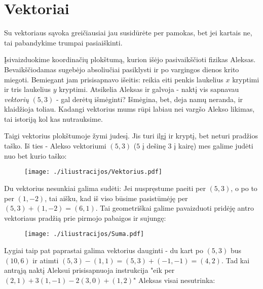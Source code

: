 \section{Vektoriai}

Su vektoriaus sąvoka greičiausiai jau susidūrėte per pamokas, bet jei kartais ne, tai pabandykime trumpai pasiaiškinti.

\medskip

Įsivaizduokime koordinačių plokštumą, kurion išėjo pasivaikščioti fizikas Aleksas. Bevaikščiodamas sugebėjo absoliučiai pasiklysti ir po vargingos dienos krito miegoti. Bemiegant jam prisisapnavo išeitis: reikia eiti penkis laukelius $x$ kryptimi ir tris laukelius $y$ kryptimi. Atsikelia Aleksas ir galvoja - naktį vis sapnavau {\it vektorių} $(5,3)$ - gal derėtų išmėginti? Išmėgina, bet, deja namų neranda, ir klaidžioja toliau. Kadangi vektorius mums rūpi labiau nei vargšo Alekso likimas, tai istoriją kol kas nutrauksime.  

\medskip

Taigi vektorius plokštumoje žymi judesį. Jis turi ilgį ir kryptį, bet neturi pradžios taško. Iš ties - Alekso vektoriumi $(5,3)$ ($5$ į dešinę $3$ į kairę) mes galime judėti nuo bet kurio taško:

\begin{figure}[h!]
  \begin{center}
    \texttt{[image: ./iliustracijos/Vektorius.pdf]}
  \end{center}
\end{figure}

\bigskip

Du vektorius nesunkiai galima sudėti: Jei nuspręstume paeiti per $(5,3)$, o po to per $(1,-2)$, tai aišku, kad iš viso būsime pasistūmėję per $(5,3)+(1,-2)=(6,1)$. Tai geometriškai galime pavaizduoti pridėję antro vektoriaus pradžią prie pirmojo pabaigos ir sujungę:

\begin{figure}[h!]
  \begin{center}
    \texttt{[image: ./iliustracijos/Suma.pdf]}
  \end{center}
\end{figure}

\bigskip

Lygiai taip pat paprastai galima vektorius dauginti - du kart po $(5,3)$ bus $(10,6)$ ir atimti $(5,3) - (1,1) = (5,3) + (-1,-1) = (4,2)$. Tad kai antrąją naktį Aleksui prisisapnuoja instrukcija "eik per $(2,1) + 3(1,-1) -2(3,0) + (1,2)$" Aleksas visai nesutrinka: 


